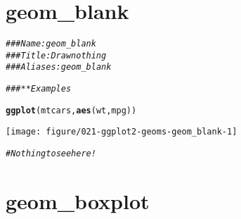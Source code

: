 \documentclass[a4paper,titlepage]{tufte-handout}\usepackage[]{graphicx}\usepackage[]{color}
\makeatletter
\def\maxwidth{ %
  \ifdim\Gin@nat@width>\linewidth
    \linewidth
  \else
    \Gin@nat@width
  \fi
}
\newcommand{\hlcom}[1]{\textcolor[rgb]{0.678,0.584,0.686}{\textit{#1}}}%
\newcommand{\hlstd}[1]{\textcolor[rgb]{0.345,0.345,0.345}{#1}}%
\newcommand{\hlkwd}[1]{\textcolor[rgb]{0.737,0.353,0.396}{\textbf{#1}}}%
\newenvironment{kframe}{%
 \def\at@end@of@kframe{}%
 \ifinner\ifhmode%
  \def\at@end@of@kframe{\end{minipage}}%
  \begin{minipage}{\columnwidth}%
 \fi\fi%
 \def\FrameCommand##1{\hskip\@totalleftmargin \hskip-\fboxsep
 \colorbox{shadecolor}{##1}\hskip-\fboxsep
     \hskip-\linewidth \hskip-\@totalleftmargin \hskip\columnwidth}%
 \MakeFramed {\advance\hsize-\width
   \@totalleftmargin\z@ \linewidth\hsize
   \@setminipage}}%
 {\par\unskip\endMakeFramed%
 \at@end@of@kframe}
\newenvironment{knitrout}{}{} %
\makeatother
\begin{document}
\section{geom\_blank}

\begin{knitrout}
\color{fgcolor}\begin{kframe}
\begin{alltt}
\hlcom{### Name: geom_blank}
\hlcom{### Title: Draw nothing}
\hlcom{### Aliases: geom_blank}

\hlcom{### ** Examples}

\hlkwd{ggplot}\hlstd{(mtcars,} \hlkwd{aes}\hlstd{(wt, mpg))}
\end{alltt}
\end{kframe}
\texttt{[image: figure/021-ggplot2-geoms-geom\_blank-1]} 
\begin{kframe}\begin{alltt}
\hlcom{# Nothing to see here!}
\end{alltt}
\end{kframe}
\end{knitrout}


\section{geom\_boxplot}
\end{document}

